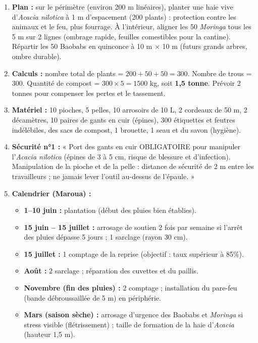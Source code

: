 \documentclass[11pt]{article}
\begin{document}
\begin{corrige}
\begin{enumerate}
    \item \textbf{Plan :} sur le périmètre (environ 200 m linéaires), planter une haie vive d'\textit{Acacia nilotica} à 1 m d'espacement (200 plants) : protection contre les animaux et le feu, plus fourrage. À l'intérieur, aligner les 50 \textit{Moringa} tous les 5 m sur 2 lignes (ombrage rapide, feuilles comestibles pour la cantine). Répartir les 50 Baobabs en quinconce à 10 m $\times$ 10 m (futurs grands arbres, ombre durable).
    \item \textbf{Calculs :} nombre total de plants = $200 + 50 + 50 = 300$. Nombre de trous = 300. Quantité de compost = $300 \times 5 = 1500$ kg, soit \textbf{1,5 tonne}. Prévoir 2 tonnes pour compenser les pertes et le tassement.
    \item \textbf{Matériel :} 10 pioches, 5 pelles, 10 arrosoirs de 10 L, 2 cordeaux de 50 m, 2 décamètres, 10 paires de gants en cuir (épines), 300 étiquettes et feutres indélébiles, des sacs de compost, 1 brouette, 1 seau et du savon (hygiène).
    \item \textbf{Sécurité n°1 :} « Port des gants en cuir OBLIGATOIRE pour manipuler l'\textit{Acacia nilotica} (épines de 3 à 5 cm, risque de blessure et d'infection). Manipulation de la pioche et de la pelle : distance de sécurité de 2 m entre les travailleurs ; ne jamais lever l'outil au-dessus de l'épaule. »
    \item \textbf{Calendrier (Maroua) :}
    \begin{itemize}
        \item \textbf{1--10 juin :} plantation (début des pluies bien établies).
        \item \textbf{15 juin -- 15 juillet :} arrosage de soutien 2 fois par semaine si l'arrêt des pluies dépasse 5 jours ; 1 sarclage (rayon 30 cm).
        \item \textbf{15 juillet :} 1 comptage de la reprise (objectif : taux supérieur à 85\%).
        \item \textbf{Août :} 2 sarclage ; réparation des cuvettes et du paillis.
        \item \textbf{Novembre (fin des pluies) :} 2 comptage ; installation du pare-feu (bande débroussaillée de 5 m) en périphérie.
        \item \textbf{Mars (saison sèche) :} arrosage d'urgence des Baobabs et \textit{Moringa} si stress visible (flétrissement) ; taille de formation de la haie d'\textit{Acacia} (hauteur 1,5 m).
    \end{itemize}
\end{enumerate}
\end{corrige}
\end{document}
